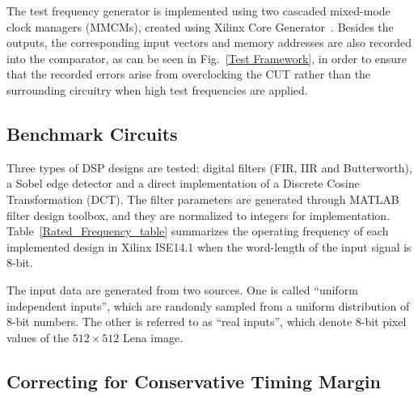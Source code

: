 \documentclass[prodmode,acmtrets]{acmsmall} %
\begin{document}
The test frequency generator is implemented using two cascaded mixed-mode clock managers (MMCMs), created using Xilinx Core Generator~\cite{Virtex6Clocking}. Besides the outputs, the corresponding input vectors and memory addresses are also recorded into the comparator, as can be seen in Fig.~\ref{Test Framework}, in order to ensure that the recorded errors arise from overclocking the CUT rather than the surrounding circuitry when high test frequencies are applied.

\subsection{Benchmark Circuits}
Three types of DSP designs are tested: digital filters (FIR, IIR and Butterworth), a Sobel edge detector and a direct implementation of a Discrete Cosine Transformation (DCT). The filter parameters are generated through MATLAB filter design toolbox, and they are normalized to integers for implementation. Table~\ref{Rated_Frequency_table} summarizes the operating frequency of each implemented design in Xilinx ISE14.1 when the word-length of the input signal is 8-bit.
%
\begin{table}[htbp]%
\vspace{-1ex}
\end{table}%

The input data are generated from two sources. One is called ``uniform independent inputs'', which are randomly sampled from a uniform distribution of 8-bit numbers. The other is referred to as ``real inputs'', which denote 8-bit pixel values of the $512\! \times\! 512$ Lena image.

\subsection{Correcting for Conservative Timing Margin} %
\label{sub:exploring_the_conservative_timing_margin}
\end{document}
